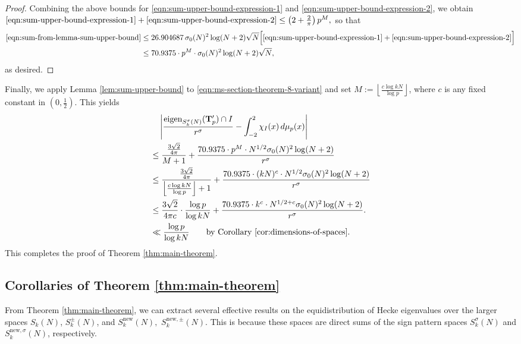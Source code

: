 \documentclass[11pt,letterpaper,reqno]{amsart}
\theoremstyle{definition}
\numberwithin{equation}{section}
\numberwithin{figure}{section}
\numberwithin{table}{section}
\let\subsectiontemp\subsection
\renewcommand{\subsection}[1]{ 
    \subsectiontemp{#1} \hfill\vspace{0.5\linespacing} 
}
\newcommand{\nw}{\mathrm{new}}
\begin{document}
\begin{proof}
Combining the above bounds for \eqref{eqn:sum-upper-bound-expression-1} and \eqref{eqn:sum-upper-bound-expression-2}, we obtain $\eqref{eqn:sum-upper-bound-expression-1} + \eqref{eqn:sum-upper-bound-expression-2} \leq \left( 2 + \frac{2}{\pi} \right) p^M,$ so that
\begin{align}
    \eqref{eqn:sum-from-lemma-sum-upper-bound} &\le 26.904687 \, \sigma_0(N)^2 \log(N + 2) \sqrt{N} \Big[\eqref{eqn:sum-upper-bound-expression-1} + \eqref{eqn:sum-upper-bound-expression-2}\Big] \\
    &\le 70.9375 \cdot p^M \cdot \sigma_0(N)^2 \log(N + 2) \sqrt{N},
\end{align}
as desired.
\end{proof}

Finally, we apply Lemma \ref{lem:sum-upper-bound} to \eqref{eqn:ms-section-theorem-8-variant} and set $M:=  \left\lfloor \frac{c \log kN}{\log p} \right\rfloor$, where $c$ is any fixed constant in $\left(0, \frac{1}{2} \right).$ This yields
\begin{align}
    & \quad \left| \frac{\text{eigen}_{S_k^\sigma(N)}(\mathbf{T}_p') \cap I}{r^\sigma} - \int_{-2}^2 \chi_I(x) \, d \mu_p(x)  \right| \\
    &\leq  \frac{\frac{3\sqrt{2}}{4\pi}}{M + 1} + \frac{70.9375 \cdot p^M \cdot N^{1/2} \sigma_0(N)^2\log(N + 2)}{r^\sigma}\\
    &\leq \frac{\frac{3\sqrt{2}}{4\pi}}{\left\lfloor \frac{c \log kN}{\log p} \right\rfloor + 1} + \frac{70.9375 \cdot (kN)^c \cdot N^{1/2} \sigma_0(N)^2\log(N + 2)}{r^\sigma}\\
    &\leq \frac{3\sqrt{2}}{4\pi c} \cdot \frac{\log p}{ \log kN} + \frac{70.9375 \cdot k^c \cdot N^{1/2 + c} \sigma_0(N)^2 \log(N + 2)}{r^\sigma}. \label{eqn:MS-Theorem-19-Analog}\\
    &\ll \frac{\log p}{\log kN} \qquad \text{by Corollary \ref{cor:dimensions-of-spaces}.}
\end{align}
This completes the proof of Theorem \ref{thm:main-theorem}.

\subsection{Corollaries of Theorem \ref{thm:main-theorem}}

From Theorem \ref{thm:main-theorem}, we can extract several effective results on the equidistribution of Hecke eigenvalues over the larger spaces $S_k(N)$, $S_k^\pm(N)$, and $S_k^{\nw}(N),$ $S_k^{\nw, \pm }(N)$. This is because these spaces are direct sums of the sign pattern spaces $S_k^\sigma(N)$ and $S_k^{\nw, \sigma}(N)$, respectively.
\end{document}
